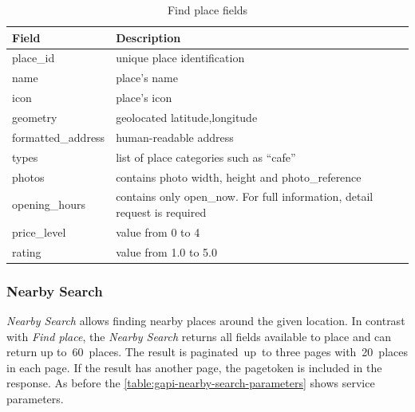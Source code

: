 \begin{table}[htbp]
\centering
\begin{tabularx}{\textwidth}{|l|X|}
\hline
\textbf{Field}     & \textbf{Description}                                                      \\ \hline
place\_id          & unique place identification                                                \\ \hline
name               & place's name                                                              \\ \hline
icon               & place's icon                                                              \\ \hline
geometry           & geolocated latitude,longitude                                             \\ \hline
formatted\_address & human-readable address                                                    \\ \hline
types              & list of place categories such as ``cafe''                                 \\ \hline
photos             & contains photo width, height and photo\_reference                          \\ \hline
opening\_hours     & contains only open\_now. For full information, detail request is required \\ \hline
price\_level       & value from 0 to 4                                                         \\ \hline
rating             & value from 1.0 to 5.0                                                     \\ \hline
\end{tabularx}
\caption{Find place fields}
\label{table:gapi-find-place-fields}
\end{table}
\subsubsection{Nearby Search}
\textit{Nearby Search} allows finding nearby places around the given location. In contrast with \textit{Find place}, the \textit{Nearby Search} returns all fields available to place and can return up to~60~places. The result is paginated~up~to three pages with~20~places in each page. If the result has another page, the pagetoken is included in the response. As before the \cref{table:gapi-nearby-search-parameters} shows service parameters.

